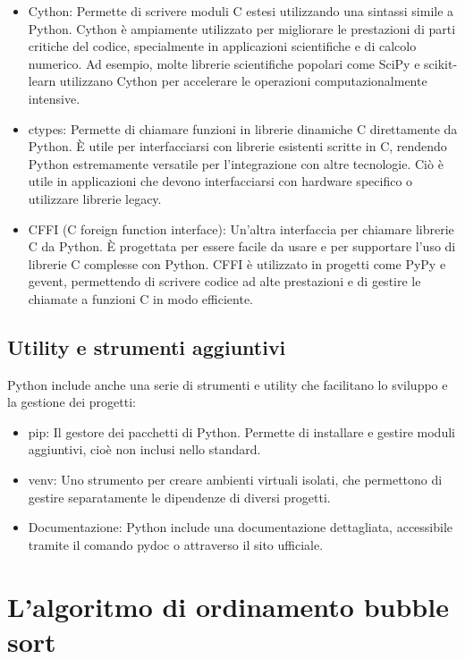 \documentclass[
  letterpaper,
  DIV=11,
  numbers=noendperiod]{scrreprt}
\providecommand{\tightlist}{%
  \setlength{\itemsep}{0pt}\setlength{\parskip}{0pt}}\usepackage{longtable,booktabs,array}
\begin{document}
\begin{itemize}
\tightlist
\item
  Cython: Permette di scrivere moduli C estesi utilizzando una sintassi
  simile a Python. Cython è ampiamente utilizzato per migliorare le
  prestazioni di parti critiche del codice, specialmente in applicazioni
  scientifiche e di calcolo numerico. Ad esempio, molte librerie
  scientifiche popolari come SciPy e scikit-learn utilizzano Cython per
  accelerare le operazioni computazionalmente intensive.
\item
  ctypes: Permette di chiamare funzioni in librerie dinamiche C
  direttamente da Python. È utile per interfacciarsi con librerie
  esistenti scritte in C, rendendo Python estremamente versatile per
  l'integrazione con altre tecnologie. Ciò è utile in applicazioni che
  devono interfacciarsi con hardware specifico o utilizzare librerie
  legacy.
\item
  CFFI (C foreign function interface): Un'altra interfaccia per chiamare
  librerie C da Python. È progettata per essere facile da usare e per
  supportare l'uso di librerie C complesse con Python. CFFI è utilizzato
  in progetti come PyPy e gevent, permettendo di scrivere codice ad alte
  prestazioni e di gestire le chiamate a funzioni C in modo efficiente.
\end{itemize}

\subsection{Utility e strumenti
aggiuntivi}\label{utility-e-strumenti-aggiuntivi}

Python include anche una serie di strumenti e utility che facilitano lo
sviluppo e la gestione dei progetti:

\begin{itemize}
\tightlist
\item
  pip: Il gestore dei pacchetti di Python. Permette di installare e
  gestire moduli aggiuntivi, cioè non inclusi nello standard.
\item
  venv: Uno strumento per creare ambienti virtuali isolati, che
  permettono di gestire separatamente le dipendenze di diversi progetti.
\item
  Documentazione: Python include una documentazione dettagliata,
  accessibile tramite il comando pydoc o attraverso il sito ufficiale.
\end{itemize}

\section{L'algoritmo di ordinamento bubble
sort}\label{lalgoritmo-di-ordinamento-bubble-sort}
\end{document}

